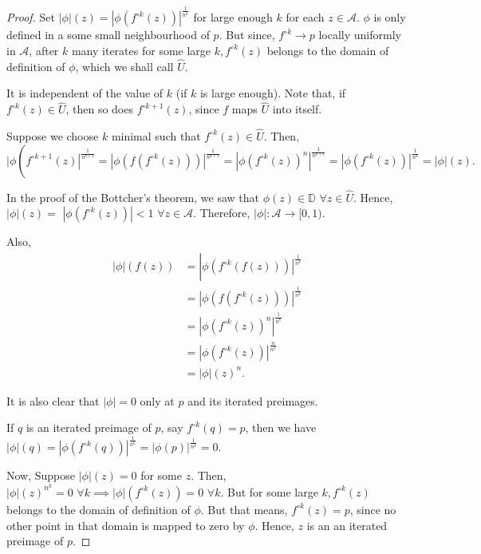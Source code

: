 \begin{proof}
Set $|\phi|(z)=\left|\phi\left(f^{\circ k}(z)\right)\right|^{\frac{1}{n^{k}}}$ for large enough $k$ for each $z \in \mathcal{A}$. $\phi$ is only defined in a some small neighbourhood of $p$. But since, $f^{\circ k} \rightarrow p$ locally uniformly in $\mathcal{A}$, after $k$ many iterates for some large $k, f^{\circ k}(z)$ belongs to the domain of definition of $\phi$, which we shall call $\hat{U}$.

It is independent of the value of $k$ (if $k$ is large enough). Note that, if $f^{\circ k}(z) \in \hat{U}$, then so does $f^{\circ k+1}(z)$, since $f$ maps $\hat{U}$ into itself.

Suppose we choose $k$ minimal such that $f^{\circ k}(z) \in \hat{U}$. Then,
$$
\mid \phi\left(\left.f^{\circ k+1}(z)\right|^{\frac{1}{n^{k+1}}}=\left|\phi\left(f\left(f^{\circ k}(z)\right)\right)\right|^{\frac{1}{n^{k+1}}}=\left|\phi\left(f^{\circ k}(z)\right)^{n}\right|^{\frac{1}{n^{k+1}}}=\left|\phi\left(f^{\circ k}(z)\right)\right|^{\frac{1}{n^{k}}}=|\phi|(z) .\right.
$$

In the proof of the Bottcher's theorem, we saw that $\phi(z) \in \mathbb{D}\,\, \forall z \in \hat{U}$. Hence, $|\phi|(z)=$ $\left|\phi\left(f^{\circ k}(z)\right)\right|<1\,\, \forall z \in \mathcal{A}$. Therefore, $|\phi|: \mathcal{A} \rightarrow[0,1)$.

Also,
$$
\begin{aligned}
|\phi|(f(z)) & =\left| \phi\left(\left.f^{\circ k}(f(z))\right)\right|^{\frac{1}{n^{k}}}\right. \\
& =\left|\phi\left(f\left(f^{\circ k}(z)\right)\right)\right|^{\frac{1}{n^{k}}} \\
& =\left|\phi\left(f^{\circ k}(z)\right)^{n}\right|^{\frac{1}{n^{k}}} \\
& =\left|\phi\left(f^{\circ k}(z)\right)\right|^{\frac{n}{n^{k}}} \\
& =|\phi|(z)^{n} .
\end{aligned}
$$

It is also clear that $|\phi|=0$ only at $p$ and its iterated preimages.

If $q$ is an iterated preimage of $p$, say $f^{\circ k}(q)=p$, then we have $|\phi|(q)=\left|\phi\left(f^{\circ k}(q)\right)\right|^{\frac{1}{n^{k}}}=|\phi(p)|^{\frac{1}{n^{k}}}=0$.

Now, Suppose $|\phi|(z)=0$ for some $z$. Then, $|\phi|(z)^{n^{k}}=0 \,\,\forall k \implies|\phi|\left(f^{\circ k}(z)\right)=0 \,\,\forall k$. But for some large $k, f^{\circ k}(z)$ belongs to the domain of definition of $\phi$. But that means, $f^{\circ k}(z)=p$, since no other point in that domain is mapped to zero by $\phi$. Hence, $z$ is an an iterated preimage of $p$.


\end{proof}
